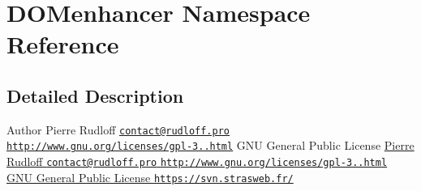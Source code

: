 \hypertarget{namespaceDOMenhancer}{\section{D\-O\-Menhancer Namespace Reference}
\label{namespaceDOMenhancer}
}


\subsection{Detailed Description}
\begin{DoxyAuthor}{Author}
Pierre Rudloff \href{mailto:contact@rudloff.pro}{\tt contact@rudloff.\-pro}  \href{http://www.gnu.org/licenses/gpl-3.0.html}{\tt http\-://www.\-gnu.\-org/licenses/gpl-\/3..\-html} G\-N\-U General Public License \hyperlink{}{Pierre Rudloff \href{mailto:contact@rudloff.pro}{\tt contact@rudloff.\-pro}  \href{http://www.gnu.org/licenses/gpl-3.0.html}{\tt http\-://www.\-gnu.\-org/licenses/gpl-\/3..\-html} G\-N\-U General Public License  \href{https://svn.strasweb.fr/}{\tt https\-://svn.\-strasweb.\-fr/} }
\end{DoxyAuthor}
